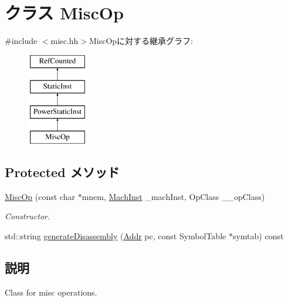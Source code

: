 \hypertarget{classPowerISA_1_1MiscOp}{
\section{クラス MiscOp}
\label{classPowerISA_1_1MiscOp}
}


{\ttfamily \#include $<$misc.hh$>$}MiscOpに対する継承グラフ:\begin{figure}[H]
\begin{center}
\leavevmode
\includegraphics[height=4cm]{classPowerISA_1_1MiscOp}
\end{center}
\end{figure}
\subsection*{Protected メソッド}
\begin{DoxyCompactItemize}
\item 
\hyperlink{classPowerISA_1_1MiscOp_a526e96598b64c32357da0b7fd18e9d23}{MiscOp} (const char $\ast$mnem, \hyperlink{namespacePowerISA_a301c22ea09fa33dcfe6ddf22f203699c}{MachInst} \_\-machInst, OpClass \_\-\_\-opClass)
\begin{DoxyCompactList}\small\item\em Constructor. \item\end{DoxyCompactList}\item 
std::string \hyperlink{classPowerISA_1_1MiscOp_a95d323a22a5f07e14d6b4c9385a91896}{generateDisassembly} (\hyperlink{base_2types_8hh_af1bb03d6a4ee096394a6749f0a169232}{Addr} pc, const SymbolTable $\ast$symtab) const 
\end{DoxyCompactItemize}


\subsection{説明}
Class for misc operations. 

